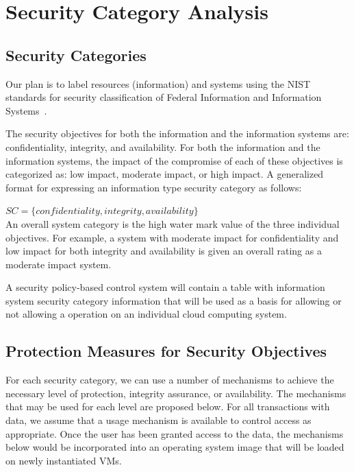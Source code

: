 \documentclass{acm_proc_article-sp}
\begin{document}
\section{Security Category Analysis}
\subsection{Security Categories}

Our plan is to label resources (information) and systems using the NIST standards for security classification of Federal Information and Information Systems~\cite{FIPS199}.

The security objectives for both the information and the information systems are: confidentiality, integrity, and availability.  For both the information and the information systems, the impact of the compromise of each of these objectives is categorized as: low impact, moderate impact, or high impact.  A generalized format for expressing an information type security category as follows:

\begin{math}
SC= \{confidentiality,integrity,availability\}
\end{math}
\\

An overall system category is the high water mark value of the three individual objectives.  For example, a system with moderate impact for confidentiality and low impact for both integrity and availability is given an overall rating as a moderate impact system.

A security policy-based control system will contain a table with information system security category information that will be used as a basis for allowing or not allowing a operation on an individual cloud computing system.

\subsection{Protection Measures for Security Objectives}

For each security category, we can use a number of mechanisms to achieve the necessary level of protection, integrity assurance, or availability.  The mechanisms that may be used for each level are proposed below.  For all transactions with data, we assume that a usage mechanism is available to control access as appropriate.  Once the user has been granted access to the data, the mechanisms below would be incorporated into an operating system image that will be loaded on newly instantiated VMs.
\end{document}
